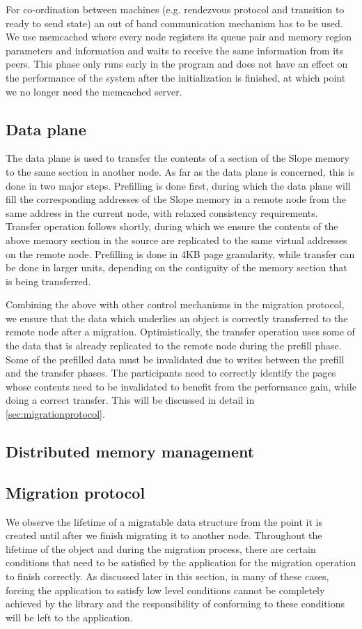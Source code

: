 For co-ordination between machines (e.g. rendezvous protocol and transition
to ready to send state)
an out of band communication mechanism has to be used. We use memcached where 
every node registers its queue pair and memory region parameters and
information and waits to receive the same information from its peers. This
phase only runs early in the program and does not have an effect on the
performance of the system after the initialization is finished, at which point
we no longer need the memcached server.

\subsection{Data plane}

The data plane is used to transfer the contents of a section of the Slope
memory to the same section in another node. As far as the data plane is
concerned, this is done in two major steps. Prefilling is done first, during
which the data plane will fill the corresponding addresses of the
Slope memory in a remote node from the same address in the current node, with
relaxed consistency requirements. Transfer operation follows shortly, during
which we ensure the contents of the above memory section in the source are
replicated to the same virtual addresses on the remote node. Prefilling is done
in 4KB page granularity, while transfer can be done in larger units, depending
on the contiguity of the memory section that is being transferred.

Combining the above with other control mechanisms in the migration protocol, we
ensure that the data which underlies an object is correctly transferred to the
remote node after a migration. Optimistically, the transfer operation uses some
of the data that is already replicated to the remote node during the prefill
phase. Some of the prefilled data must be invalidated due to writes between the
prefill and the transfer phases. The participants need to correctly identify
the pages whose contents need to be invalidated to benefit from the performance
gain, while doing a correct transfer. This will be discussed in detail in
\autoref{sec:migrationprotocol}.

\subsection{Distributed memory management}

\subsection{Migration protocol}
\label{sec:migrationprotocol}
We observe the lifetime of a migratable data structure from the point it is
created until after we finish migrating it to another node. Throughout the
lifetime of the object and during the migration process, there are certain
conditions that need to be satisfied by the application for the migration
operation to finish correctly. As discussed later in this section,
in many of these cases, forcing the application to satisfy low level conditions
cannot be completely achieved by the library and the responsibility of
conforming to these conditions will be left to the application.


